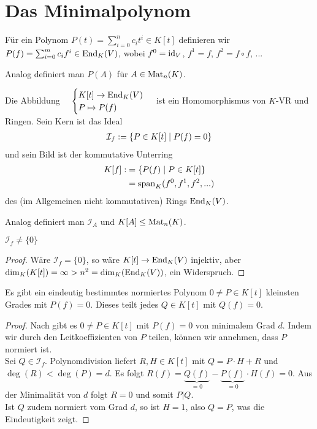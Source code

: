 \section{Das Minimalpolynom}

\begin{definition}
	Für ein Polynom $P(t)=\sum_{i=0}^n c_it^i\in K[t]$ definieren wir $P(f)=\sum_{i=0}^m c_if^i\in\operatorname{End}_K(V)$, wobei $f^0=\operatorname{id}_V$, $f^1=f$, $f^2=f\circ f$, ...
	
	Analog definiert man $P(A)$ für $A\in\operatorname{Mat}_n(K)$.
\end{definition}

\begin{remark}
	Die Abbildung $\quad\begin{cases}K[t]\to \operatorname{End}_K(V)\\ P\mapsto P(f)\end{cases}$ ist ein Homomorphismus von $K$-VR und Ringen. Sein Kern ist das Ideal 
	\begin{align}
		\mathcal{I}_f:=\{P\in K[t]\mid P(f)=0\}\notag
	\end{align}
	und sein Bild ist der kommutative Unterring 
	\begin{align}
		K[f]:&=\{P(f)\mid P\in K[t]\}\notag \\
		&= \operatorname{span}_K(f^0,f^1,f^2,...)\notag
	\end{align}
	des (im Allgemeinen nicht kommutativen) Rings $\operatorname{End}_K(V)$.
	
	Analog definiert man $\mathcal{I}_A$ und $K[A]\le \operatorname{Mat}_n(K)$.
\end{remark}

\begin{lemma}
	$\mathcal{I}_f\neq\{0\}$
\end{lemma}
\begin{proof}
	Wäre $\mathcal{I}_f=\{0\}$, so wäre $K[t]\to \operatorname{End}_K(V)$ injektiv, aber $\dim_K(K[t])= \infty>n^2=\dim_K(\operatorname{End}_K(V))$, ein Widerspruch.
\end{proof}

\begin{proposition}
	Es gibt ein eindeutig bestimmtes normiertes Polynom $0\neq P\in K[t]$ kleinsten Grades mit $P(f)=0$. Dieses teilt jedes $Q\in K[t]$ mit $Q(f)=0$.
\end{proposition}
\begin{proof}
	Nach  gibt es $0\neq P\in K[t]$ mit $P(f)=0$ von minimalem Grad $d$. Indem wir durch den Leitkoeffizienten von $P$ teilen, können wir annehmen, dass $P$ normiert ist. \\
	Sei $Q\in\mathcal{I}_f$. Polynomdivision liefert $R,H\in K[t]$ mit $Q=P\cdot H+R$ und $\deg(R)<\deg(P)=d$. Es folgt $R(f)=\underbrace{Q(f)}_{=0}-\underbrace{P(f)}_{=0}\cdot H(f)=0$. Aus der Minimalität von $d$ folgt $R=0$ und somit $P\vert Q$. \\
	Ist $Q$ zudem normiert vom Grad $d$, so ist $H=1$, also $Q=P$, was die Eindeutigkeit zeigt.
\end{proof}


